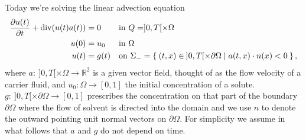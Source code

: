 Today we're solving the linear advection equation
\begin{subequations}\label{eq:advection}
\begin{align}
\frac{\partial u(t)}{\partial t} + \operatorname{div} (u(t)a(t)) &= 0 && \text{in } Q = ]0,T[ \times \Omega\\
u(0) &= u_0 && \text{in } \Omega\\
u(t) &= g(t) && \text{on } \Sigma_- = \Set{(t,x) \in \: ]0,T[ \times \partial\Omega | a(t,x)\cdot n(x) < 0},
\end{align}
\end{subequations}
where $a: \: ]0,T[ \times \Omega \to \mathbb{R}^2$ is a given vector field, thought of as the flow velocity of a carrier fluid, and $u_0: \Omega \to [0,1]$ the initial concentration of a solute. $g: \: ]0,T[ \times \partial\Omega \to [0,1]$ prescribes the concentration on that part of the boundary $\partial \Omega$ where the flow of solvent is directed into the domain and we use $n$ to denote the outward pointing unit normal vectors on $\partial \Omega$. For simplicity we assume in what follows that $a$ and $g$ do not depend on time.

